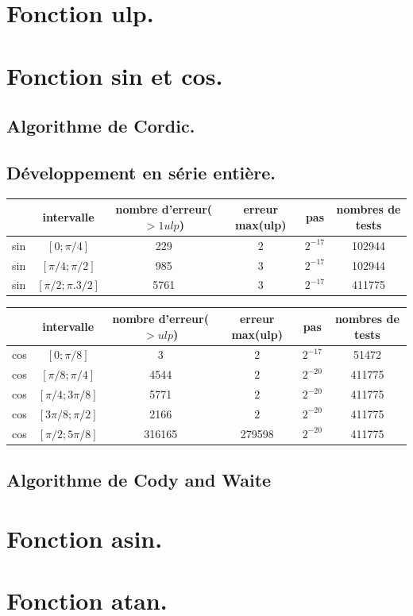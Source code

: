 \documentclass[a4,12pt]{article}
\begin{document}
\section{Fonction ulp.}
\section{Fonction sin et cos.}
\subsection{Algorithme de Cordic.}
\subsection{Développement en série entière.}

\begin{tabular}{|c|c|c|c|c|c|}

\hline 
 & intervalle & nombre d'erreur($ > 1 ulp$) & erreur max(ulp) & pas & nombres de tests \\
\hline 
sin & $[0;\pi /4]$ & 229 & $2$ & $2^{-17}$ & 102944\\
\hline
sin & $[\pi /4;\pi /2]$ & 985 & $3$ & $2^{-17}$ & 102944\\
\hline
sin & $[\pi /2;\pi .3/2]$ & 5761 & $3$ & $2^{-17}$ & 411775\\
\hline
\end{tabular}

\begin{tabular}{|c|c|c|c|c|c|}

\hline 
 & intervalle & nombre d'erreur($ >  ulp$) & erreur max(ulp) & pas & nombres de tests \\
\hline
cos & $[0;\pi /8]$ & 3 & $2$ & $2^{-17}$ & 51472\\
\hline
cos & $[\pi /8;\pi /4]$ & 4544 & $2$ & $2^{-20}$ & 411775\\
\hline
cos & $[\pi /4;3\pi /8]$ & 5771 & $2$ & $2^{-20}$ & 411775\\
\hline
cos & $[3\pi /8;\pi /2]$ & 2166 & $2$ & $2^{-20}$ & 411775\\
\hline
cos & $[\pi /2;5\pi /8]$ & 316165 & 279598 & $2^{-20}$ & 411775\\
\hline
\end{tabular}


\subsection{Algorithme de Cody and Waite}
\section{Fonction asin.}
\section{Fonction atan.}
\end{document}
